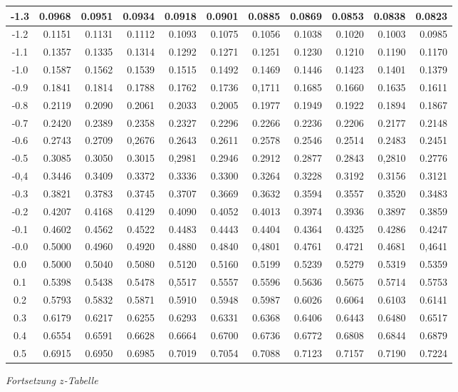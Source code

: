 \documentclass[11pt,a4paper]{article}
\begin{document}
\begin{table}[h]
\begin{tabular}{|c||r|r|r|r|r|r|r|r|r|r|}
		\hline
		-1.3	& 0.0968	& 0.0951	& 0.0934	& 0.0918	& 0.0901	& 0.0885	& 0.0869	& 0.0853	& 0.0838	& 0.0823\\
		\hline
		-1.2	& 0.1151	& 0.1131	& 0.1112	& 0.1093	& 0.1075	& 0.1056	& 0.1038	& 0.1020	& 0.1003	& 0.0985\\
		\hline
		-1.1	& 0.1357	& 0.1335	& 0.1314	& 0.1292	& 0.1271	& 0.1251	& 0.1230	& 0.1210	& 0.1190	& 0.1170\\
		\hline
		-1.0	& 0.1587	& 0.1562	& 0.1539	& 0.1515	& 0.1492	& 0.1469	& 0.1446	& 0.1423	& 0.1401	& 0.1379\\
		\hline
		-0.9	& 0.1841	& 0.1814	& 0.1788	& 0.1762	& 0.1736	& 0,1711	& 0.1685	& 0.1660	& 0.1635	& 0.1611\\
		\hline
		-0.8	& 0.2119	& 0.2090	& 0.2061	& 0.2033	& 0.2005	& 0.1977	& 0.1949	& 0.1922	& 0.1894	& 0.1867\\
		\hline
		-0.7	& 0.2420	& 0.2389	& 0.2358	& 0.2327	& 0.2296	& 0.2266	& 0.2236	& 0.2206	& 0.2177	& 0.2148\\
		\hline
		-0.6	& 0.2743	& 0.2709	& 0,2676	& 0.2643	& 0.2611	& 0.2578	& 0.2546	& 0.2514	& 0.2483	& 0.2451\\
		\hline
		-0.5	& 0.3085	& 0.3050	& 0.3015	& 0,2981	& 0.2946	& 0.2912	& 0.2877	& 0.2843	& 0,2810	& 0.2776\\
		\hline
		-0,4	& 0.3446	& 0.3409	& 0.3372	& 0.3336	& 0.3300	& 0.3264	& 0.3228	& 0.3192	& 0.3156	& 0.3121\\
		\hline
		-0.3	& 0.3821	& 0.3783	& 0.3745	& 0.3707	& 0.3669	& 0.3632	& 0.3594	& 0.3557	& 0.3520	& 0.3483\\
		\hline
		-0.2	& 0.4207	& 0.4168	& 0.4129	& 0.4090	& 0.4052	& 0.4013	& 0.3974	& 0.3936	& 0.3897	& 0.3859\\
		\hline
		-0.1	& 0.4602	& 0.4562	& 0.4522	& 0.4483	& 0.4443	& 0.4404	& 0.4364	& 0.4325	& 0.4286	& 0.4247\\
		\hline
		-0.0	& 0.5000	& 0.4960	& 0.4920	& 0.4880	& 0.4840	& 0,4801	& 0.4761	& 0.4721	& 0.4681	& 0,4641\\
		\hline
		0.0	& 0.5000	& 0.5040	& 0.5080	& 0.5120	& 0.5160	& 0.5199	& 0.5239	& 0.5279	& 0.5319	& 0.5359\\
		\hline
		0.1	& 0.5398	& 0.5438	& 0.5478	& 0,5517	& 0.5557	& 0.5596	& 0.5636	& 0.5675	& 0.5714	& 0.5753\\
		\hline
		0.2	& 0.5793	& 0.5832	& 0.5871	& 0.5910	& 0.5948	& 0.5987	& 0.6026	& 0.6064	& 0.6103	& 0.6141\\
		\hline
		0.3	& 0.6179	& 0.6217	& 0.6255	& 0.6293	& 0.6331	& 0.6368	& 0.6406	& 0.6443	& 0.6480	& 0.6517\\
		\hline
		0.4	& 0.6554	& 0.6591	& 0.6628	& 0.6664	& 0.6700	& 0.6736	& 0.6772	& 0.6808	& 0.6844	& 0.6879\\
		\hline
		0.5	& 0.6915	& 0.6950	& 0.6985	& 0.7019	& 0.7054	& 0.7088	& 0.7123	& 0.7157	& 0.7190	& 0.7224\\
		\hline
		\end{tabular}
\end{table}
\newpage
\textit{Fortsetzung $z$-Tabelle}\\
\end{document}

